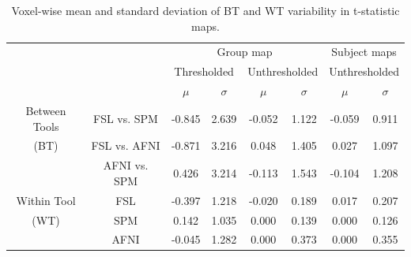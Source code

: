 \setlength{\tabcolsep}{5pt}
\begin{table}[h]
  \centering
  \begin{tabular}{cccccc|cc}
    \toprule
                      &              & \multicolumn{4}{c|}{Group map}  & \multicolumn{2}{c}{Subject maps}                                                                     \\
    \multirow{2}{*}{} & {}           & \multicolumn{2}{c}{Thresholded} & \multicolumn{2}{c|}{Unthresholded} & \multicolumn{2}{c}{Unthresholded}                               \\
    {}                & {}           & $\mu$                           & $\sigma$                           & $\mu$                             & $\sigma$ & $\mu$ & $\sigma$ \\
    \midrule
    \rowcolor{lightgray!50}
    {Between Tools}   & FSL vs. SPM  & -0.845                           & 2.639                              & -0.052                             & 1.122    & -0.059 & 0.911    \\
    \rowcolor{lightgray!50}
    {(BT)}            & FSL vs. AFNI & -0.871                           & 3.216                              & 0.048                             & 1.405    & 0.027 & 1.097    \\
    \rowcolor{lightgray!50}
    {}                & AFNI vs. SPM & 0.426                           & 3.214                              & -0.113                             & 1.543    & -0.104 & 1.208    \\
    {Within Tool}     & FSL          & -0.397                           & 1.218                              & -0.020                             & 0.189    & 0.017 & 0.207    \\
    {(WT)}            & SPM          & 0.142                           & 1.035                              & 0.000                             & 0.139    & 0.000 & 0.126    \\
    {}                & AFNI         & -0.045                           & 1.282                              & 0.000                             & 0.373    & 0.000 & 0.355    \\
    \bottomrule
  \end{tabular}
  \caption{Voxel-wise mean and standard deviation of BT and WT variability in t-statistic maps.}
  \label{table:pipeline-stats}
\end{table}


